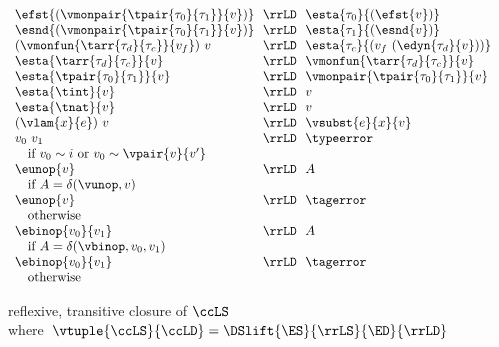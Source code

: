 \begin{flushleft}
\begin{minipage}[t]{\columnwidth}
\smallskip
{}\\
$\begin{array}{l@{~~}c@{~~}l l}
  \efst{(\vmonpair{\tpair{\tau_0}{\tau_1}}{v})} & \rrLD & \esta{\tau_0}{(\efst{v})}
\\
  \esnd{(\vmonpair{\tpair{\tau_0}{\tau_1}}{v})} & \rrLD & \esta{\tau_1}{(\esnd{v})}
\\
  (\vmonfun{\tarr{\tau_d}{\tau_c}}{v_f})~v & \rrLD & \esta{\tau_c}{(v_f~(\edyn{\tau_d}{v}))}
\\
  \esta{\tarr{\tau_d}{\tau_c}}{v} & \rrLD & \vmonfun{\tarr{\tau_d}{\tau_c}}{v}
\\
  \esta{\tpair{\tau_0}{\tau_1}}{v} & \rrLD & \vmonpair{\tpair{\tau_0}{\tau_1}}{v}
\\
  \esta{\tint}{v} & \rrLD & v
\\
  \esta{\tnat}{v} & \rrLD & v
\\
  (\vlam{x}{e})~v & \rrLD & \vsubst{e}{x}{v} &
\\
  v_0~v_1 & \rrLD & \typeerror &
\\\multicolumn{3}{l}{\mbox{\quad if $v_0 \sim i$ or $v_0 \sim \vpair{v}{v'}$}}
\\
  \eunop{v} & \rrLD & A &
\\\multicolumn{3}{l}{\mbox{\quad if $A = \delta(\vunop, v)$}}
\\
  \eunop{v} & \rrLD & \tagerror &
\\\multicolumn{3}{l}{\mbox{\quad otherwise}}
\\
  \ebinop{v_0}{v_1} & \rrLD & A &
\\\multicolumn{3}{l}{\mbox{\quad if $A = \delta(\vbinop, v_0, v_1)$}}
\\
  \ebinop{v_0}{v_1} & \rrLD & \tagerror &
\\\multicolumn{3}{l}{\mbox{\quad otherwise}}
\end{array}$

\smallskip
{} reflexive, transitive closure of $\ccLS$\\
\mbox{\quad where $\vtuple{\ccLS}{\ccLD} = \DSlift{\ES}{\rrLS}{\ED}{\rrLD}$}
\smallskip
\end{minipage}\hspace{\columnsep}%
\begin{minipage}[t]{\columnwidth}
\\
\begin{mathpar}


\end{mathpar}
\end{minipage}
\end{flushleft}
